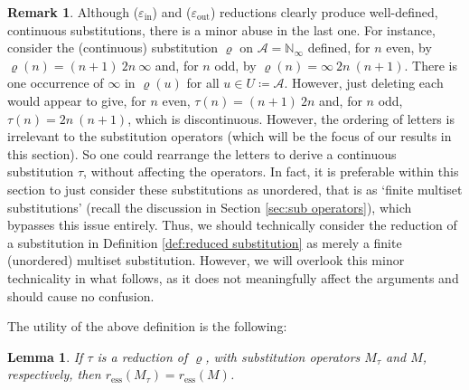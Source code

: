 \documentclass[11pt]{amsart}
\numberwithin{equation}{section}
\theoremstyle{plain}
\newtheorem{lemma}[theorem]{Lemma}
\theoremstyle{definition}
\newtheorem{remark}[theorem]{Remark}
\newcommand{\N}{{\mathbb N}}
\newcommand{\mc}{\mathcal}
\newcommand{\A}{\mc A}
\newcommand{\sub}{\varrho}
\begin{document}
\begin{remark}
Although (\(\varepsilon_\mathrm{in}\)) and (\(\varepsilon_\mathrm{out}\)) reductions clearly produce well-defined, continuous substitutions, there is a minor abuse in the last one. For instance, consider the (continuous) substitution \(\sub\) on \(\A = \N_\infty\) defined, for \(n\) even, by \( \sub(n) = (n+1) \ 2n \ \infty\) and, for \(n\) odd, by \(\sub(n) = \infty \ 2n \ (n+1)\). There is one occurrence of \(\infty\) in \(\sub(u)\) for all \(u \in U \coloneqq \A\). However, just deleting each would appear to give, for \(n\) even, \(\tau(n) = (n+1) \ 2n\) and, for \(n\) odd, \(\tau(n) = 2n \ (n+1)\), which is discontinuous. However, the ordering of letters is irrelevant to the substitution operators (which will be the focus of our results in this section). So one could rearrange the letters to derive a continuous substitution \(\tau\), without affecting the operators. In fact, it is preferable within this section to just consider these substitutions as unordered, that is as `finite multiset substitutions' (recall the discussion in Section \ref{sec:sub operators}), which bypasses this issue entirely. Thus, we should technically consider the reduction of a substitution in Definition \ref{def:reduced substitution} as merely a finite (unordered) multiset substitution. However, we will overlook this minor technicality in what follows, as it does not meaningfully affect the arguments and should cause no confusion.
\end{remark}

The utility of the above definition is the following:

\begin{lemma}\label{lem:essential spectral radius unaffected by reduction}
If \(\tau\) is a reduction of \(\sub\), with substitution operators \(M_\tau\) and \(M\), respectively, then \(r_\mathrm{ess}(M_\tau) = r_\mathrm{ess}(M)\).
\end{lemma}
\end{document}
